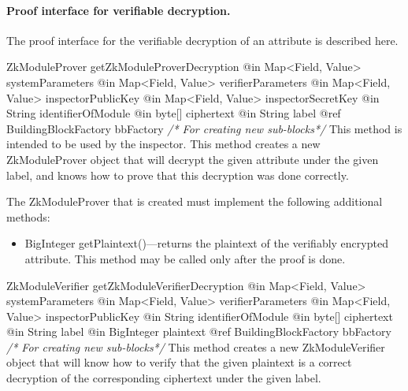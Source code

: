     \paragraph{Proof interface for verifiable decryption.}
    The proof interface for the verifiable decryption of an attribute is described here.
      \begin{method}
      {ZkModuleProver}
      {getZkModuleProverDecryption}
      {
        {@in Map<Field, Value> systemParameters}
        {@in Map<Field, Value> verifierParameters}
        {@in Map<Field, Value> inspectorPublicKey}
        {@in Map<Field, Value> inspectorSecretKey}
        {@in String identifierOfModule}
        {@in byte[] ciphertext}
        {@in String label}
        {@ref BuildingBlockFactory bbFactory \textrm{\emph{/* For creating new sub-blocks*/}}}
      }
      This method is intended to be used by the inspector.
      This method creates a new ZkModuleProver object that will
      decrypt the given attribute under the given label, and knows how to prove that this
      decryption was done correctly.

      The ZkModuleProver that is created must implement the following additional methods:
      \begin{itemize}
        \item BigInteger getPlaintext()---returns the plaintext of the verifiably encrypted attribute.
                This method may be called only after the proof is done.
      \end{itemize}

      \end{method}
      \begin{method}
      {ZkModuleVerifier}
      {getZkModuleVerifierDecryption}
      {
        {@in Map<Field, Value> systemParameters}
        {@in Map<Field, Value> verifierParameters}
        {@in Map<Field, Value> inspectorPublicKey}
        {@in String identifierOfModule}
        {@in byte[] ciphertext}
        {@in String label}
        {@in BigInteger plaintext}
        {@ref BuildingBlockFactory bbFactory \textrm{\emph{/* For creating new sub-blocks*/}}}
      }
      This method creates a new ZkModuleVerifier object that will know how to verify
      that the given plaintext is a correct decryption of the corresponding ciphertext
      under the given label.
      \end{method}

